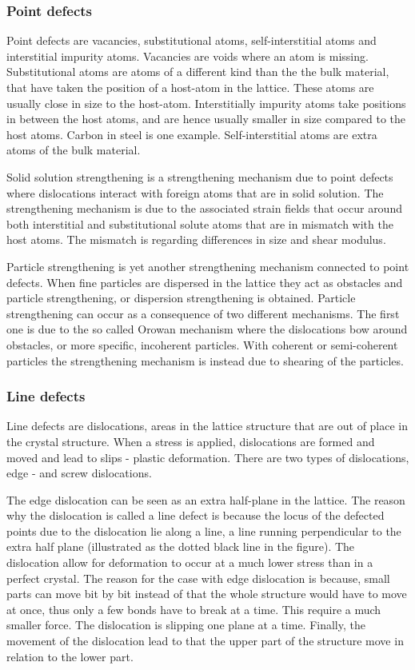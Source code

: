\documentclass{article}
\begin{document}
\subsubsection{Point defects}

Point defects are vacancies, substitutional atoms, self-interstitial atoms and interstitial impurity atoms. Vacancies are voids where an atom is missing. Substitutional atoms are atoms of a different kind than the the bulk material, that have taken the position of a host-atom in the lattice. These atoms are usually close in size to the host-atom. Interstitially impurity atoms take positions in between the host atoms, and are hence usually smaller in size compared to the host atoms. Carbon in steel is one example. Self-interstitial atoms are extra atoms of the bulk material. 

Solid solution strengthening is a strengthening mechanism due to point defects where dislocations interact with foreign atoms that are in solid solution. The strengthening mechanism is due to the associated strain fields that occur around both interstitial and substitutional solute atoms that are in mismatch with the host atoms. The mismatch is regarding differences in size and shear modulus. 

Particle strengthening is yet another strengthening mechanism connected to point defects. When fine particles are dispersed in the lattice they act as obstacles and particle strengthening, or dispersion strengthening is obtained. Particle strengthening can occur as a consequence of two different mechanisms. The first one is due to the so called Orowan mechanism where the dislocations bow around obstacles, or more specific, incoherent particles. With coherent or semi-coherent particles the strengthening mechanism is instead due to shearing of the particles. 

\subsubsection{Line defects}

Line defects are dislocations, areas in the lattice structure that are out of place in the crystal structure. When a stress is applied, dislocations are formed and moved and lead to slips - plastic deformation. There are two types of dislocations, edge - and screw dislocations. 

The edge dislocation can be seen as an extra half-plane in the lattice. The reason why the dislocation is called a line defect is because the locus of the defected points due to the dislocation lie along a line, a line running perpendicular to the extra half plane (illustrated as the dotted black line in the figure). The dislocation allow for deformation to occur at a much lower stress than in a perfect crystal. The reason for the case with edge dislocation is because, small parts can move bit by bit instead of that the whole structure would have to move at once, thus only a few bonds have to break at a time. This require a much smaller force. The dislocation is slipping one plane at a time. Finally, the movement of the dislocation lead to that the upper part of the structure move in relation to the lower part.
\end{document}
